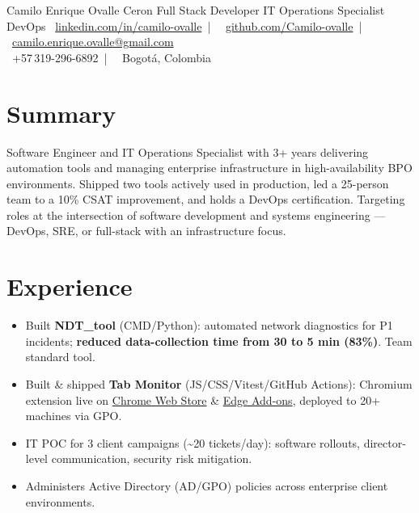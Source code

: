 \documentclass[10pt]{article}
\begin{document}
\cvheader
  {Camilo Enrique Ovalle Ceron}
  {Full Stack Developer \textbar{} IT Operations Specialist \textbar{} DevOps}
  {%
    \faLinkedin~\href{https://linkedin.com/in/camilo-ovalle}{linkedin.com/in/camilo-ovalle}~|~%
    \faGithub~\href{https://github.com/Camilo-ovalle}{github.com/Camilo-ovalle}~|~%
    \faEnvelope~\href{mailto:camilo.enrique.ovalle@gmail.com}{camilo.enrique.ovalle@gmail.com}\\[1pt]%
    \faPhone~+57\,319-296-6892~|~%
    \faMapMarker*~Bogotá, Colombia%
  }

\section{Summary}

Software Engineer and IT Operations Specialist with 3+ years delivering automation
tools and managing enterprise infrastructure in high-availability BPO environments.
Shipped two tools actively used in production, led a 25-person team to a 10\% CSAT
improvement, and holds a DevOps certification. Targeting roles at the intersection of
software development and systems engineering — DevOps, SRE, or full-stack with an
infrastructure focus.

\section{Experience}

\begin{itemize}
  \item Built \textbf{NDT\_tool} (CMD/Python): automated network diagnostics for P1 incidents;
        \textbf{reduced data-collection time from 30 to 5 min (83\%)}. Team standard tool.
  \item Built \& shipped \textbf{Tab Monitor} (JS/CSS/Vitest/GitHub Actions): Chromium extension
        live on \href{https://chromewebstore.google.com/detail/tab-monitor/apbgiakfdalcpmnopopopookdceecnfj}{Chrome Web Store}
        \& \href{https://microsoftedge.microsoft.com/addons/detail/tab-monitor/aidfbccdmjdoloknpoiacciagffokjcb}{Edge Add-ons},
        deployed to 20+ machines via GPO.
  \item IT POC for 3 client campaigns (\textasciitilde20 tickets/day): software rollouts,
        director-level communication, security risk mitigation.
  \item Administers Active Directory (AD/GPO) policies across enterprise client environments.
\end{itemize}
\end{document}
